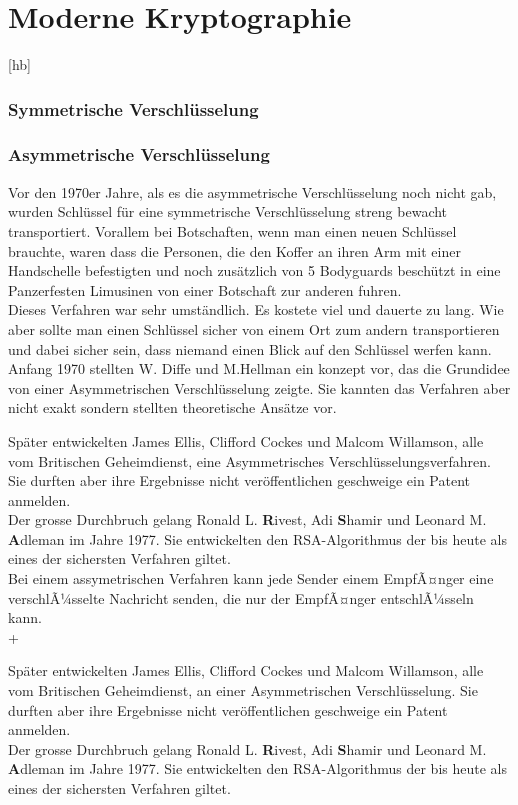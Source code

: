 \section{Moderne Kryptographie}[hb]

\subsubsection{Symmetrische Verschlüsselung}
\subsubsection{Asymmetrische Verschlüsselung}
Vor den 1970er Jahre, als es die asymmetrische Verschlüsselung noch nicht gab, wurden Schlüssel für eine symmetrische Verschlüsselung streng bewacht transportiert.
Vorallem bei Botschaften, wenn man einen neuen Schlüssel brauchte, waren dass die Personen, die den Koffer an ihren Arm mit einer Handschelle befestigten und noch zusätzlich von 5 Bodyguards beschützt in eine Panzerfesten Limusinen von einer Botschaft zur anderen fuhren.\\
Dieses Verfahren war sehr umständlich. Es kostete viel und dauerte zu lang. Wie aber sollte man einen Schlüssel sicher von einem Ort zum andern transportieren und dabei sicher sein, dass niemand einen Blick auf den Schlüssel werfen kann.\\
Anfang 1970 stellten W. Diffe und M.Hellman ein konzept vor, das die Grundidee von einer Asymmetrischen Verschlüsselung zeigte. Sie kannten das Verfahren aber nicht exakt sondern stellten theoretische Ansätze vor.



Später entwickelten James Ellis, Clifford Cockes und Malcom Willamson, alle vom Britischen Geheimdienst,  eine Asymmetrisches Verschlüsselungsverfahren. Sie durften aber ihre Ergebnisse nicht veröffentlichen geschweige ein Patent anmelden.\\
 Der grosse Durchbruch gelang Ronald L. \textbf{R}ivest, Adi \textbf{S}hamir und Leonard M. \textbf{A}dleman im Jahre 1977. Sie entwickelten den RSA-Algorithmus der bis heute als eines der sichersten Verfahren giltet.\\[2ex]
Bei einem assymetrischen Verfahren kann jede Sender einem EmpfÃ¤nger eine verschlÃ¼sselte Nachricht senden, die nur der EmpfÃ¤nger entschlÃ¼sseln kann.\\
+%






Später entwickelten James Ellis, Clifford Cockes und Malcom Willamson, alle vom Britischen Geheimdienst, an einer Asymmetrischen Verschlüsselung. Sie durften aber ihre Ergebnisse nicht veröffentlichen geschweige ein Patent anmelden.\\
Der grosse Durchbruch gelang Ronald L. \textbf{R}ivest, Adi \textbf{S}hamir und Leonard M. \textbf{A}dleman im Jahre 1977. Sie entwickelten den RSA-Algorithmus der bis heute als eines der sichersten Verfahren giltet.\\[2ex]
%
